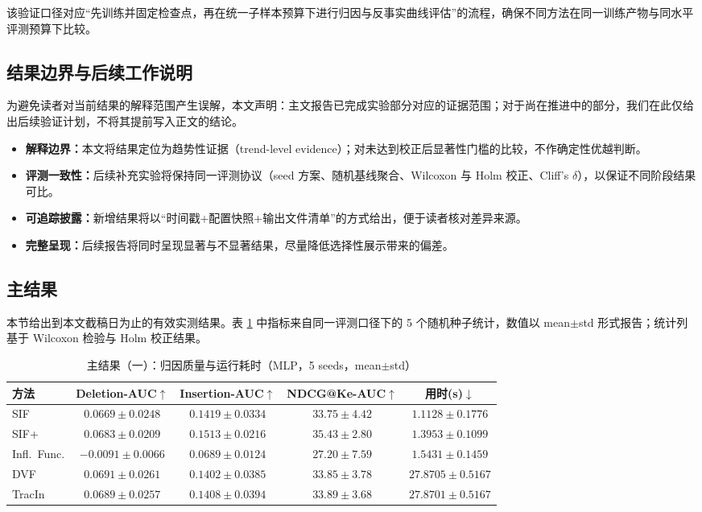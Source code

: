 \documentclass[12pt,a4paper]{ctexart}
\theoremstyle{definition}
\theoremstyle{plain}
\begin{document}
该验证口径对应“先训练并固定检查点，再在统一子样本预算下进行归因与反事实曲线评估”的流程，确保不同方法在同一训练产物与同水平评测预算下比较。

\subsection{结果边界与后续工作说明}
为避免读者对当前结果的解释范围产生误解，本文声明：主文报告已完成实验部分对应的证据范围；对于尚在推进中的部分，我们在此仅给出后续验证计划，不将其提前写入正文的结论。
\begin{itemize}
    \item \textbf{解释边界：}本文将结果定位为趋势性证据（trend-level evidence）；对未达到校正后显著性门槛的比较，不作确定性优越判断。
    \item \textbf{评测一致性：}后续补充实验将保持同一评测协议（seed 方案、随机基线聚合、Wilcoxon 与 Holm 校正、Cliff's $\delta$），以保证不同阶段结果可比。
    \item \textbf{可追踪披露：}新增结果将以“时间戳+配置快照+输出文件清单”的方式给出，便于读者核对差异来源。
    \item \textbf{完整呈现：}后续报告将同时呈现显著与不显著结果，尽量降低选择性展示带来的偏差。
\end{itemize}


\subsection{主结果}
本节给出到本文截稿日为止的有效实测结果。表 \ref{tab:main_result} 中指标来自同一评测口径下的 5 个随机种子统计，数值以 mean$\pm$std 形式报告；统计列基于 Wilcoxon 检验与 Holm 校正结果。

\begin{table}[htbp]
\centering
\caption{主结果（一）：归因质量与运行耗时（MLP，5 seeds，mean$\pm$std）}
\label{tab:main_result}
\small
\begin{tabular}{@{}lcccc@{}}
\toprule
方法 & Deletion-AUC$\uparrow$ & Insertion-AUC$\uparrow$ & NDCG@Ke-AUC$\uparrow$ & 用时(s)$\downarrow$ \\ \midrule
SIF             & $0.0669\pm0.0248$ & $0.1419\pm0.0334$ & $33.75\pm4.42$ & $1.1128\pm0.1776$ \\
SIF+            & $0.0683\pm0.0209$ & $0.1513\pm0.0216$ & $35.43\pm2.80$ & $1.3953\pm0.1099$ \\
Infl.\ Func.    & $-0.0091\pm0.0066$ & $0.0689\pm0.0124$ & $27.20\pm7.59$ & $1.5431\pm0.1459$ \\
DVF             & $0.0691\pm0.0261$ & $0.1402\pm0.0385$ & $33.85\pm3.78$ & $27.8705\pm0.5167$ \\
TracIn          & $0.0689\pm0.0257$ & $0.1408\pm0.0394$ & $33.89\pm3.68$ & $27.8701\pm0.5167$ \\ \bottomrule
\end{tabular}
\end{table}
\end{document}

